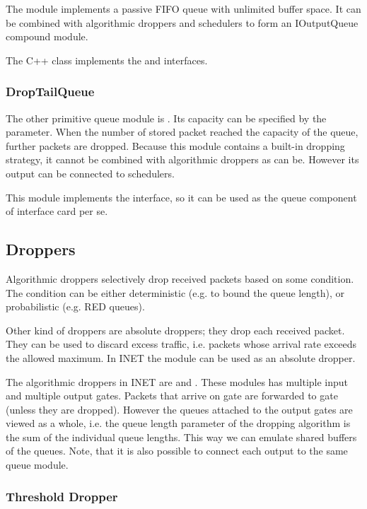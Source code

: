 The  module implements a passive
FIFO queue with unlimited buffer space. It can be combined
with algorithmic droppers and schedulers to form an
IOutputQueue compound module.

The C++ class implements the  and
 interfaces.

\subsubsection{DropTailQueue}

The other primitive queue module is .
Its capacity can be specified by the 
parameter. When the number of stored packet reached the capacity
of the queue, further packets are dropped.
Because this module contains a built-in dropping strategy, it
cannot be combined with algorithmic droppers as 
can be. However its output can be connected to schedulers.

This module implements the  interface,
so it can be used as the queue component of interface card per se.

\subsection{Droppers}

Algorithmic droppers selectively drop received packets based on some condition.
The condition can be either deterministic (e.g. to bound the queue length),
or probabilistic (e.g. RED queues).

Other kind of droppers are absolute droppers; they drop each received
packet. They can be used to discard excess traffic, i.e. packets whose
arrival rate exceeds the allowed maximum. In INET the 
module can be used as an absolute dropper.

The algorithmic droppers in INET are  and
. These modules has multiple input and multiple
output gates. Packets that arrive on gate  are forwarded
to gate  (unless they are dropped). However the queues
attached to the output gates are viewed as a whole, i.e. the queue
length parameter of the dropping algorithm is the sum of the individual
queue lengths. This way we can emulate shared buffers of the queues.
Note, that it is also possible to connect each output to the same
queue module.

\subsubsection{Threshold Dropper}

